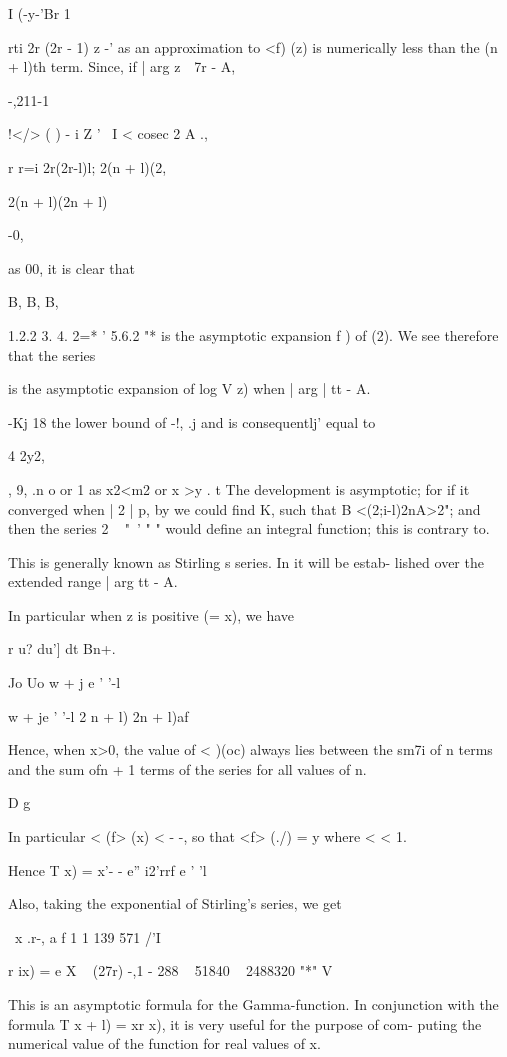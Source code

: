 I (-y-'Br 1

rti 2r (2r - 1) z -' as an approximation to <f) (z) is numerically
less than the (n + l)th term. Since, if | arg z\ \ 7r - A,

-,211-1

!</> ( ) - i Z ' \ I < cosec 2 A .,

r r=i 2r(2r-l)l; 2(n + l)(2,

2(n + l)(2n + l)

-0,

as 00, it is clear that

B, B, B,

1.2.2 3. 4. 2=* ' 5.6.2 "* is the asymptotic expansion f ) of
(2). We see therefore that the series

is the asymptotic expansion of log V z) when | arg | tt - A.

-Kj 18 the lower bound of -!, .j and is consequentlj' equal to

4 2y2,

, 9, .n o or 1 as x2<m2 or x >y . t The development is asymptotic;
for if it converged when | 2 | p, by we could find K, such that
B <(2;i-l)2nA>2"; and then the series 2 ~ "~' " " would define an
integral function; this is contrary to.

%
%

This is generally known as Stirling s series. In it will be
estab- lished over the extended range | arg tt - A.

In particular when z is positive (= x), we have

r u? du'] dt Bn+.

Jo Uo w + j e ' '-l

w + je ' '-l 2 n + l) 2n + l)af

Hence, when x>0, the value of < )(oc) always lies between the sm7i of
n terms and the sum ofn + 1 terms of the series for all values of n.

D g

In particular < (f> (x) < - -, so that <f> (./) = y where < < 1.

Hence T x) = x'- - e'' i2'rrf e ' 'l

Also, taking the exponential of Stirling's series, we get

\ x .r-, a f 1 1 139 571 /'I

r ix) = e X ~ (27r) -,1 - 288 ~ 51840 ~ 2488320 "*" V

This is an asymptotic formula for the Gamma-function. In conjunction
with the formula T x + l) = xr x), it is very useful for the purpose
of com- puting the numerical value of the function for real values of
x.

